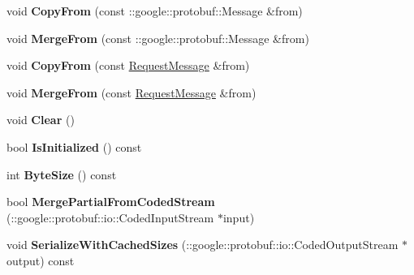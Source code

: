 \begin{DoxyCompactItemize}
\item 
\hypertarget{classmessaging_1_1RequestMessage_af21b2d291d7b455505534c5607bd2ae4}{
void {\bfseries CopyFrom} (const ::google::protobuf::Message \&from)}
\label{classmessaging_1_1RequestMessage_af21b2d291d7b455505534c5607bd2ae4}

\item 
\hypertarget{classmessaging_1_1RequestMessage_ae400d288ac5dbc36cd48298e9fd3acb4}{
void {\bfseries MergeFrom} (const ::google::protobuf::Message \&from)}
\label{classmessaging_1_1RequestMessage_ae400d288ac5dbc36cd48298e9fd3acb4}

\item 
\hypertarget{classmessaging_1_1RequestMessage_a7e8370008cffba2a2322bc5cc074e4ce}{
void {\bfseries CopyFrom} (const \hyperlink{classmessaging_1_1RequestMessage}{RequestMessage} \&from)}
\label{classmessaging_1_1RequestMessage_a7e8370008cffba2a2322bc5cc074e4ce}

\item 
\hypertarget{classmessaging_1_1RequestMessage_ab8ef15832bfc6fb40b5d418f03a49b79}{
void {\bfseries MergeFrom} (const \hyperlink{classmessaging_1_1RequestMessage}{RequestMessage} \&from)}
\label{classmessaging_1_1RequestMessage_ab8ef15832bfc6fb40b5d418f03a49b79}

\item 
\hypertarget{classmessaging_1_1RequestMessage_af4e5735fe5e219f63096b2f1ab87d482}{
void {\bfseries Clear} ()}
\label{classmessaging_1_1RequestMessage_af4e5735fe5e219f63096b2f1ab87d482}

\item 
\hypertarget{classmessaging_1_1RequestMessage_a56ae2011121293a190a2b1ae0b038041}{
bool {\bfseries IsInitialized} () const }
\label{classmessaging_1_1RequestMessage_a56ae2011121293a190a2b1ae0b038041}

\item 
\hypertarget{classmessaging_1_1RequestMessage_ad9235b3f3595be9d49ec28fe652b84f6}{
int {\bfseries ByteSize} () const }
\label{classmessaging_1_1RequestMessage_ad9235b3f3595be9d49ec28fe652b84f6}

\item 
\hypertarget{classmessaging_1_1RequestMessage_abddbbad2b780085846220e4edfd2eab0}{
bool {\bfseries MergePartialFromCodedStream} (::google::protobuf::io::CodedInputStream $\ast$input)}
\label{classmessaging_1_1RequestMessage_abddbbad2b780085846220e4edfd2eab0}

\item 
\hypertarget{classmessaging_1_1RequestMessage_a19f22ff4b311eda48a372c01e5cce445}{
void {\bfseries SerializeWithCachedSizes} (::google::protobuf::io::CodedOutputStream $\ast$output) const }
\label{classmessaging_1_1RequestMessage_a19f22ff4b311eda48a372c01e5cce445}


\end{DoxyCompactItemize}
